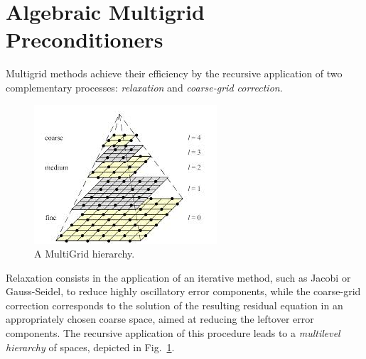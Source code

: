 \section{Algebraic Multigrid Preconditioners\label{AMG}} 
%
Multigrid methods achieve  their efficiency by the recursive application
of two complementary processes: \emph{relaxation} and \emph{coarse-grid
correction}.
%
\begin{figure}[t]
\begin{center}
\includegraphics[width=.75\textwidth]{multilevel.png}
\caption{A MultiGrid hierarchy.\label{hierarchy}}
\end{center}
\end{figure}
%
Relaxation consists in the application of an iterative method, such as
Jacobi or Gauss-Seidel, to reduce highly oscillatory error components,
while the coarse-grid correction corresponds to the solution of the
resulting residual equation in an appropriately chosen coarse space,
aimed at reducing the leftover error components. The recursive application
of this procedure leads to a \emph{multilevel hierarchy} of spaces,
depicted in Fig.~\ref{hierarchy}. 

